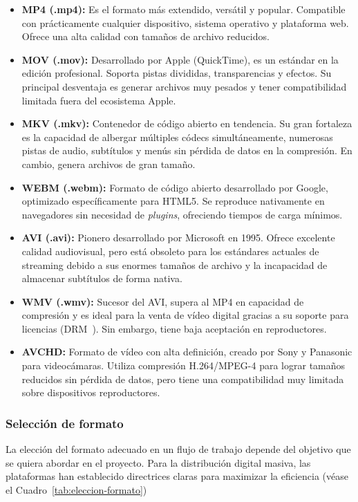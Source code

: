 \begin{itemize}
    \item \textbf{MP4 (.mp4):} Es el formato más extendido, versátil y popular. 
    Compatible con prácticamente cualquier dispositivo, sistema operativo y plataforma web. 
    Ofrece una alta calidad con tamaños de archivo reducidos.
    \item \textbf{MOV (.mov):} Desarrollado por Apple (QuickTime), es un estándar en la edición 
    profesional. Soporta pistas divididas, transparencias y efectos. Su principal desventaja es generar 
    archivos muy pesados y tener compatibilidad limitada fuera del ecosistema Apple.
    \item \textbf{MKV (.mkv):} Contenedor de código abierto en tendencia. Su gran fortaleza 
    es la capacidad de albergar múltiples códecs simultáneamente, numerosas pistas de audio, 
    subtítulos y menús sin pérdida de datos en la compresión. En cambio, genera archivos de gran tamaño.
    \item \textbf{WEBM (.webm):} Formato de código abierto desarrollado por Google,
    optimizado específicamente para HTML5. Se reproduce nativamente en navegadores sin necesidad de \textit{plugins}, 
    ofreciendo tiempos de carga mínimos.
    \item \textbf{AVI (.avi):} Pionero desarrollado por Microsoft en 1995. 
    Ofrece excelente calidad audiovisual, pero está obsoleto para los estándares actuales de streaming 
    debido a sus enormes tamaños de archivo y la incapacidad de almacenar subtítulos de forma nativa.
    \item \textbf{WMV (.wmv):} Sucesor del AVI, supera al MP4 en capacidad de compresión y es 
    ideal para la venta de vídeo digital gracias a su soporte para licencias (DRM~\cite{drm}). Sin embargo, tiene 
    baja aceptación en reproductores.
    \item \textbf{AVCHD:} Formato de vídeo con alta definición, creado por Sony y Panasonic 
    para videocámaras. Utiliza compresión H.264/MPEG-4 para lograr tamaños reducidos sin pérdida de datos, 
    pero tiene una compatibilidad muy limitada sobre dispositivos reproductores.
\end{itemize}

\subsubsection{Selección de formato}

La elección del formato adecuado en un flujo de trabajo depende del objetivo que se quiera 
abordar en el proyecto. Para la distribución digital masiva, las plataformas han establecido directrices 
claras para maximizar la eficiencia (véase el Cuadro~\ref{tab:eleccion-formato})~\cite{v-d-formato-video}

